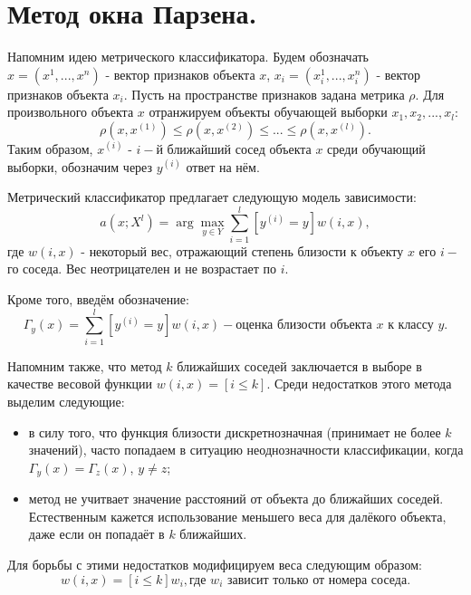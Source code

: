 \section{Метод окна Парзена.}

Напомним идею метрического классификатора. Будем обозначать $x = (x^1, ..., x^n)$ - вектор признаков объекта $x$, $x_i = (x_i^1, ..., x_i^n)$ - вектор признаков объекта $x_i$. Пусть на пространстве признаков задана метрика $\rho$. Для произвольного объекта $x$ отранжируем объекты обучающей выборки $x_1, x_2, ..., x_l$:
\begin{equation*}
    \rho(x, x^{(1)}) \le \rho(x, x^{(2)}) \le ... \le \rho(x, x^{(l)}).
\end{equation*}
Таким образом, $x^{(i)}$ - $i-$й ближайший сосед объекта $x$ среди обучающий выборки, обозначим через $y^{(i)}$ ответ на нём. 

Метрический классификатор предлагает следующую модель зависимости:
\begin{equation*}
    \displaystyle a(x; X^l) = \arg\max_{y\in Y} \sum\limits_{i=1}^l[y^{(i)}=y]w(i,x), 
\end{equation*}
где $w(i,x)$ - некоторый вес, отражающий степень близости к объекту $x$ его $i-$го соседа. Вес неотрицателен и не возрастает по $i$. 

Кроме того, введём обозначение:
\begin{equation*}
    \displaystyle \Gamma_y(x) = \sum\limits_{i=1}^l[y^{(i)}=y]w(i,x) - \text{оценка близости объекта $x$ к классу $y$}. 
\end{equation*}

Напомним также, что метод $k$ ближайших соседей заключается в выборе в качестве весовой функции $w(i,x) = [i\le k]$. Среди недостатков этого метода выделим следующие:
\begin{itemize}
    \item в силу того, что функция близости дискретнозначная (принимает не более $k$ значений), часто попадаем в ситуацию неоднозначности классификации, когда $\Gamma_y(x) = \Gamma_z(x)$, $y\ne z$;
    \item метод не учитвает значение расстояний от объекта до ближайших соседей. Естественным кажется использование меньшего веса для далёкого объекта, даже если он попадаёт в $k$ ближайших.
\end{itemize}

Для борьбы с этими недостатков модифицируем веса следующим образом:
\begin{equation*}
    w(i,x) = [i\le k]w_i, \text{где $w_i$ зависит только от номера соседа}.
\end{equation*}

